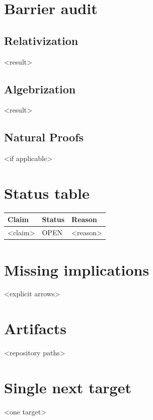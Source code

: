 \documentclass[11pt]{article}
\begin{document}
\section*{Barrier audit}
\subsection*{Relativization}
<result>
\subsection*{Algebrization}
<result>
\subsection*{Natural Proofs}
<if applicable>

\section*{Status table}
\begin{tabular}{lll}
\toprule
Claim & Status & Reason \\
\midrule
<claim> & OPEN & <reason> \\
\bottomrule
\end{tabular}

\section*{Missing implications}
<explicit arrows>

\section*{Artifacts}
<repository paths>

\section*{Single next target}
<one target>

\end{document}
